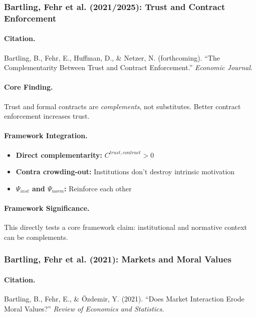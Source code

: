 \subsubsection{Bartling, Fehr et al. (2021/2025): Trust and Contract Enforcement}

\paragraph{Citation.}
Bartling, B., Fehr, E., Huffman, D., \& Netzer, N. (forthcoming).
``The Complementarity Between Trust and Contract Enforcement.''
\emph{Economic Journal}.

\paragraph{Core Finding.}
Trust and formal contracts are \emph{complements}, not substitutes.
Better contract enforcement increases trust.

\paragraph{Framework Integration.}
\begin{itemize}
  \item \textbf{Direct complementarity:} $C^{trust, contract} > 0$
  \item \textbf{Contra crowding-out:} Institutions don't destroy intrinsic motivation
  \item \textbf{$\Psi_{inst}$ and $\Psi_{norm}$:} Reinforce each other
\end{itemize}

\paragraph{Framework Significance.}
This directly tests a core framework claim: institutional and normative
context can be complements.

\subsubsection{Bartling, Fehr et al. (2021): Markets and Moral Values}

\paragraph{Citation.}
Bartling, B., Fehr, E., \& \"Ozdemir, Y. (2021).
``Does Market Interaction Erode Moral Values?''
\emph{Review of Economics and Statistics}.

